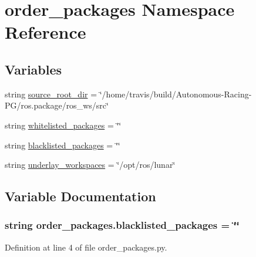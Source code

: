 \hypertarget{namespaceorder__packages}{}\section{order\+\_\+packages Namespace Reference}
\label{namespaceorder__packages}
\subsection*{Variables}
\begin{DoxyCompactItemize}
\item 
string \hyperlink{namespaceorder__packages_aff4fd297841de7fbddc2c0c33a6bab21}{source\+\_\+root\+\_\+dir} = \char`\"{}/home/travis/build/Autonomous-\/Racing-\/PG/ros.\+package/ros\+\_\+ws/src\char`\"{}
\item 
string \hyperlink{namespaceorder__packages_a84450a73e77dbf3689293b97dcb697a4}{whitelisted\+\_\+packages} = \char`\"{}\char`\"{}
\item 
string \hyperlink{namespaceorder__packages_a29ea913f00c5a0e81d3c7688e7375507}{blacklisted\+\_\+packages} = \char`\"{}\char`\"{}
\item 
string \hyperlink{namespaceorder__packages_a11d102ff09fd2977b9075c4c722015d2}{underlay\+\_\+workspaces} = \char`\"{}/opt/ros/lunar\char`\"{}
\end{DoxyCompactItemize}


\subsection{Variable Documentation}
\subsubsection[{\texorpdfstring{blacklisted\+\_\+packages}{blacklisted_packages}}]{\setlength{\rightskip}{0pt plus 5cm}string order\+\_\+packages.\+blacklisted\+\_\+packages = \char`\"{}\char`\"{}}\hypertarget{namespaceorder__packages_a29ea913f00c5a0e81d3c7688e7375507}{}\label{namespaceorder__packages_a29ea913f00c5a0e81d3c7688e7375507}


Definition at line 4 of file order\+\_\+packages.\+py.

